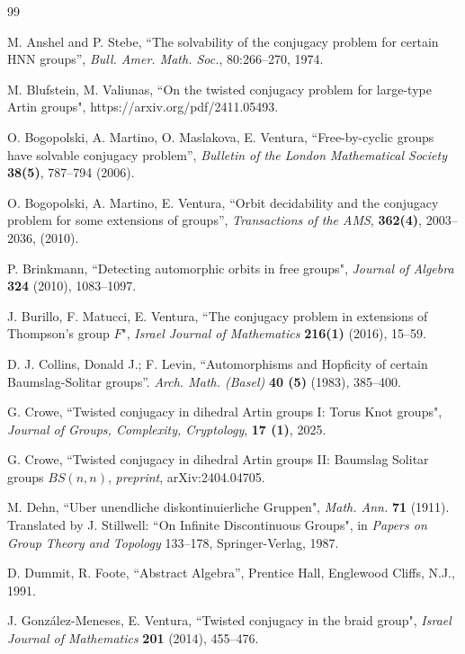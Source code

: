 \documentclass[english]{amsart}
\theoremstyle{definition}
\begin{document}
\begin{thebibliography}{99}

 M. Anshel and P. Stebe, ``The solvability of the conjugacy problem for
certain HNN groups'', \emph{Bull. Amer. Math. Soc.}, 80:266--270, 1974.

 M. Blufstein, M. Valiunas, ``On the twisted conjugacy problem for large-type Artin groups", https://arxiv.org/pdf/2411.05493. 

 O. Bogopolski, A. Martino, O. Maslakova, E. Ventura, ``Free-by-cyclic groups have solvable conjugacy problem'', \textit{Bulletin of the London Mathematical Society} \textbf{38(5)}, 787--794 (2006).

 O. Bogopolski, A. Martino, E. Ventura, ``Orbit decidability and the conjugacy problem for some extensions of groups'', \textit{Transactions of the AMS}, \textbf{362(4)}, 2003--2036, (2010).

 P. Brinkmann, ``Detecting automorphic orbits in free groups", \emph{Journal of Algebra} \textbf{324} (2010), 1083--1097.

 J. Burillo, F. Matucci, E. Ventura, ``The conjugacy problem in extensions of Thompson's group $F$", \emph{Israel Journal of Mathematics} \textbf{216(1)} (2016), 15--59.

 D. J. Collins, Donald J.; F. Levin, ``Automorphisms and Hopficity of certain
Baumslag-Solitar groups''. \emph{Arch. Math. (Basel)} \textbf{40 (5)} (1983), 385--400.

 G. Crowe, ``Twisted conjugacy in dihedral Artin groups I: Torus Knot groups", \emph{
Journal of Groups, Complexity, Cryptology}, \textbf{17 (1)}, 2025.

 G. Crowe, ``Twisted conjugacy in dihedral Artin groups II: Baumslag Solitar groups $BS(n,n)$, \emph{preprint}, arXiv:2404.04705.

 M. Dehn, ``Uber unendliche diskontinuierliche Gruppen", \emph{Math. Ann.} \textbf{71} (1911). Translated by J. Stillwell: ``On Infinite Discontinuous Groups", in \emph{Papers on Group Theory and Topology} 133--178, Springer-Verlag, 1987.

 D. Dummit, R. Foote, ``Abstract Algebra'', Prentice Hall, Englewood Cliffs, N.J., 1991.

 J. Gonz\'{a}lez-Meneses, E. Ventura, ``Twisted conjugacy in the braid group", \emph{Israel Journal of Mathematics} \textbf{201} (2014), 455--476.


\end{thebibliography}
\end{document}
